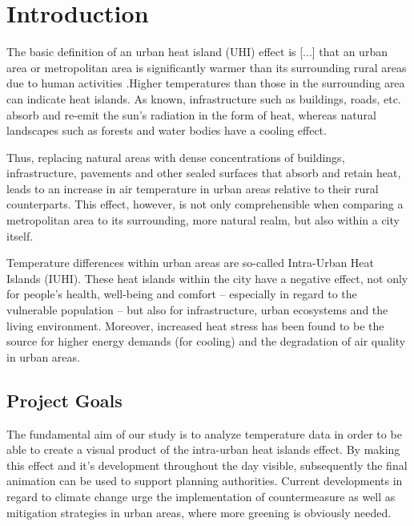 
\section{Introduction}

The basic definition of an urban heat island (UHI) effect is \ldq{}[...] that an urban area or metropolitan area is significantly warmer than its surrounding rural areas due to human activities\rdq{} \cite{takebayashi_chapter_2020}.Higher temperatures than those in the surrounding area can indicate heat islands. As known, infrastructure such as buildings, roads, etc. absorb and re-emit the sun’s radiation in the form of heat, whereas natural landscapes such as forests and water bodies have a cooling effect. \cite{us_epa_learn_2014}

Thus, replacing natural areas with dense concentrations of buildings, infrastructure, pavements and other sealed surfaces that absorb and retain heat, leads to an increase in air temperature in urban areas relative to their rural counterparts. This effect, however, is not only comprehensible when comparing a metropolitan area to its surrounding, more natural realm, but also within a city itself. 

Temperature differences within urban areas are so-called \ldq{}Intra-Urban Heat Islands (IUHI)\rdq{}. \cite{bruns_stable_2017}
These heat islands within the city have a negative effect, not only for people’s health, well-being and comfort – especially in regard to the vulnerable population – but also for infrastructure, urban ecosystems and the living environment. Moreover, increased heat stress has been found to be the source for higher energy demands (for cooling) and the degradation of air quality in urban areas. \cite{mohajerani_urban_2017}

\subsection{Project Goals}

The fundamental aim of our study is to analyze temperature data in order to be able to create a visual product of the intra-urban heat islands effect. By making this effect and it's development throughout the day visible, subsequently the final animation can be used to support planning authorities. Current developments in regard to climate change urge the implementation of countermeasure as well as mitigation strategies in urban areas, where more greening is obviously needed. \cite{ketterer_comparison_2015}

